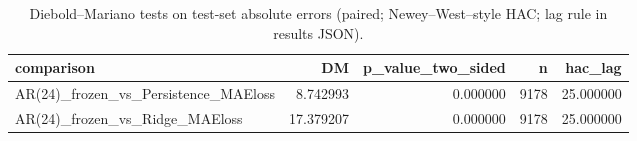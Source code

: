 \begin{table}[t]
\centering
\small
\caption{Diebold--Mariano tests on test-set absolute errors (paired; Newey--West--style HAC; lag rule in results JSON).}
\label{tab:dm}
\begin{tabular}{lrrrr}
\toprule
comparison & DM & p\_value\_two\_sided & n & hac\_lag \\
\midrule
AR(24)\_frozen\_vs\_Persistence\_MAEloss & 8.742993 & 0.000000 & 9178 & 25.000000 \\
AR(24)\_frozen\_vs\_Ridge\_MAEloss & 17.379207 & 0.000000 & 9178 & 25.000000 \\
\bottomrule
\end{tabular}
\end{table}
